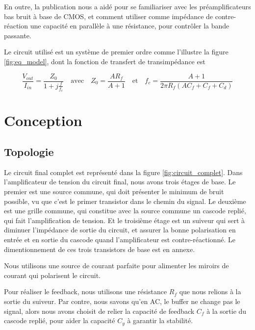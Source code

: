 \documentclass[a4paper,12pt]{article}
\numberwithin{equation}{section}
\renewcommand{\j}{\ensuremath{j}}
\newcommand{\?}{\stackrel{?}{=}}
\begin{document}
En outre, la publication \cite{sansen_1990} nous a aidé pour se familiariser avec les préamplificateurs bas bruit à base de CMOS, et comment utiliser comme impédance de contre-réaction une capacité en parallèle à une résistance, pour contrôler la bande passante.

Le circuit utilisé est un système de premier ordre comme l'illustre la figure \ref{fig:eq_model}, dont la fonction de transfert de transimpédance est

\begin{equation}\label{eq:transfer}
    \frac{V_{out}}{I_{in}}=\frac{Z_{0}}{1+\j\frac{f}{f_{c}}}
    \quad
    \text{avec}
    \quad
    Z_{0}=\frac{AR_{f}}{A + 1}
    \quad
    \text{et}
    \quad
    f_c=\frac{A+1}{2\pi R_f(AC_f+C_f+C_d)}
\end{equation}


\FloatBarrier
\newpage
\section{Conception}\label{sec:conception}

\subsection{Topologie}

Le circuit final complet est représenté dans la figure \ref{fig:circuit_complet}. Dans l'amplificateur de tension du circuit final, nous avons trois étages de base. Le premier est une source commune, qui doit présenter le minimum de bruit possible, vu que c'est le primer transistor dans le chemin du signal. Le deuxième est une grille commune, qui constitue avec la source commune un cascode replié, qui fait l'amplification de tension. Et le troisième étage est un suiveur qui sert à diminuer l'impédance de sortie du circuit, et assurer la bonne polarisation en entrée et en sortie du cascode quand l'amplificateur est contre-réactionné. Le dimentionnement de ces trois transistors de base est en annexe.

Nous utilisons une source de courant parfaite pour alimenter les miroirs de courant qui polarisent le circuit.

Pour réaliser le feedback, nous utilisons une résistance $R_f$ que nous relions à la sortie du suiveur. Par contre, nous savons qu'en AC, le buffer ne change pas le signal, alors nous avons choisit de relier la capacité de feedback $C_f$ à la sortie du cascode replié, pour aider la capacité $C_y$ à garantir la stabilité.
\end{document}
